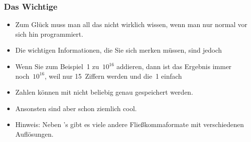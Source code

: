 \documentclass[aspectratio=169,mathserif,notheorems]{beamer}%
\begin{document}
%
\begin{frame}%
\frametitle{Das Wichtige}%
\begin{itemize}%
\item Zum Glück muss man all das nicht wirklich wissen, wenn man nur normal vor sich hin programmiert.%
\item<2-> Die wichtigen Informationen, die Sie sich merken müssen, sind jedoch
%
\item<7-> Wenn Sie zum Beispiel~1 zu~$10^{16}$ addieren, dann ist das Ergebnis immer noch~$10^{16}$, weil nur 15~Ziffern  werden und die~1 einfach %
%
\item<8-> \alert{Zahlen können mit  nicht beliebig genau gespeichert werden.}%
\item<9-> Ansonsten sind  aber schon ziemlich cool.%
\item<10-> Hinweis: Neben \python's  gibt es viele andere Fließkommaformate mit verschiedenen Auflösungen.
\end{itemize}%
\end{frame}%
%
\end{document}
